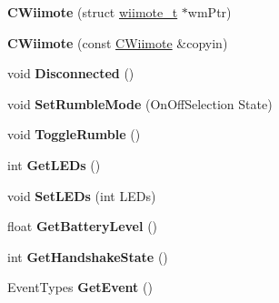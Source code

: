 \begin{DoxyCompactItemize}
\item 
\hypertarget{class_c_wiimote_aea8deb92b4f4c23ff5f619f92f5740bb}{{\bfseries C\-Wiimote} (struct \hyperlink{structwiimote__t}{wiimote\-\_\-t} $\ast$wm\-Ptr)}\label{class_c_wiimote_aea8deb92b4f4c23ff5f619f92f5740bb}

\item 
\hypertarget{class_c_wiimote_af907ec89113a3e2ec6f992bb381c6253}{{\bfseries C\-Wiimote} (const \hyperlink{class_c_wiimote}{C\-Wiimote} \&copyin)}\label{class_c_wiimote_af907ec89113a3e2ec6f992bb381c6253}

\item 
\hypertarget{class_c_wiimote_a39252c75229d1bc9d2acc126304a7ca6}{void {\bfseries Disconnected} ()}\label{class_c_wiimote_a39252c75229d1bc9d2acc126304a7ca6}

\item 
\hypertarget{class_c_wiimote_a4945392c6bcfa461bdcc6b8f5ff25ba1}{void {\bfseries Set\-Rumble\-Mode} (On\-Off\-Selection State)}\label{class_c_wiimote_a4945392c6bcfa461bdcc6b8f5ff25ba1}

\item 
\hypertarget{class_c_wiimote_af1908b383e4a700c270af461bf1b209d}{void {\bfseries Toggle\-Rumble} ()}\label{class_c_wiimote_af1908b383e4a700c270af461bf1b209d}

\item 
\hypertarget{class_c_wiimote_a288872e2efc61d986b4b49e4b868460b}{int {\bfseries Get\-L\-E\-Ds} ()}\label{class_c_wiimote_a288872e2efc61d986b4b49e4b868460b}

\item 
\hypertarget{class_c_wiimote_a3526e61d6a51b6fc8406aeca60e92318}{void {\bfseries Set\-L\-E\-Ds} (int L\-E\-Ds)}\label{class_c_wiimote_a3526e61d6a51b6fc8406aeca60e92318}

\item 
\hypertarget{class_c_wiimote_adb0acbb6196d8782790e818b4babfde7}{float {\bfseries Get\-Battery\-Level} ()}\label{class_c_wiimote_adb0acbb6196d8782790e818b4babfde7}

\item 
\hypertarget{class_c_wiimote_a35a74550a3ec0115ccb39054da4b5064}{int {\bfseries Get\-Handshake\-State} ()}\label{class_c_wiimote_a35a74550a3ec0115ccb39054da4b5064}

\item 
\hypertarget{class_c_wiimote_a75228c8fff89ce38d6c4c138e9ac5444}{Event\-Types {\bfseries Get\-Event} ()}\label{class_c_wiimote_a75228c8fff89ce38d6c4c138e9ac5444}


\end{DoxyCompactItemize}
